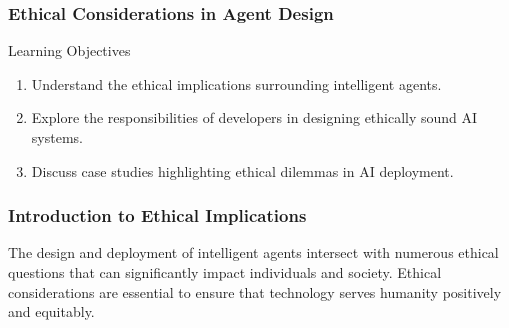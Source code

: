 \documentclass[aspectratio=169]{beamer}
\begin{document}
\begin{frame}[fragile]
  \frametitle{Ethical Considerations in Agent Design}
  
  \begin{block}{Learning Objectives}
    \begin{enumerate}
      \item Understand the ethical implications surrounding intelligent agents.
      \item Explore the responsibilities of developers in designing ethically sound AI systems.
      \item Discuss case studies highlighting ethical dilemmas in AI deployment.
    \end{enumerate}
  \end{block}
  
\end{frame}

\begin{frame}[fragile]
  \frametitle{Introduction to Ethical Implications}
  The design and deployment of intelligent agents intersect with numerous ethical questions that can significantly impact individuals and society. Ethical considerations are essential to ensure that technology serves humanity positively and equitably.
\end{frame}
\end{document}
